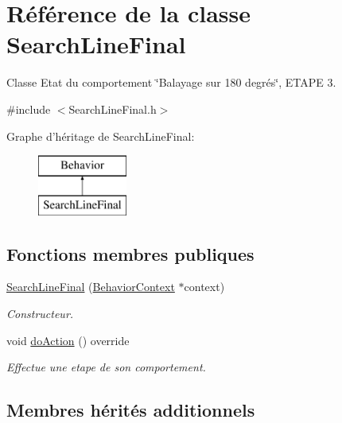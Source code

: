 \hypertarget{class_search_line_final}{\section{Référence de la classe Search\-Line\-Final}
\label{class_search_line_final}
}


Classe Etat du comportement \char`\"{}\-Balayage sur 180 degrés\char`\"{}, E\-T\-A\-P\-E 3.  




{\ttfamily \#include $<$Search\-Line\-Final.\-h$>$}

Graphe d'héritage de Search\-Line\-Final\-:\begin{figure}[H]
\begin{center}
\leavevmode
\includegraphics[height=2.000000cm]{class_search_line_final}
\end{center}
\end{figure}
\subsection*{Fonctions membres publiques}
{\bf }\par
\begin{DoxyCompactItemize}
\item 
\hyperlink{class_search_line_final_ac28b158b96d3fae1c2936d1b94c20b03}{Search\-Line\-Final} (\hyperlink{class_behavior_context}{Behavior\-Context} $\ast$context)
\begin{DoxyCompactList}\small\item\em Constructeur. \end{DoxyCompactList}\item 
void \hyperlink{class_search_line_final_a3a049cb0cdcb07fabefd7080064a2dd4}{do\-Action} () override
\begin{DoxyCompactList}\small\item\em Effectue une etape de son comportement. \end{DoxyCompactList}\end{DoxyCompactItemize}

\subsection*{Membres hérités additionnels}



